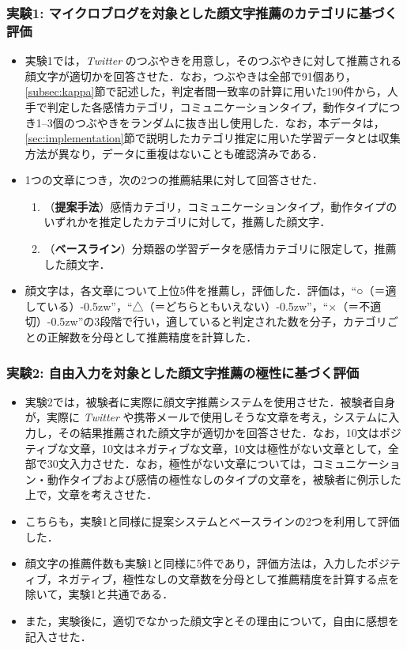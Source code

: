 \documentclass[japanese]{jnlp_1.4}
\begin{document}
\subsubsection*{実験1: マイクロブログを対象とした顔文字推薦のカテゴリに基づく評価}

\begin{itemize}
\item 実験1では，{\it Twitter} のつぶやきを用意し，そのつぶやきに対して推薦される顔文字が適切かを回答させた．なお，つぶやきは全部で91個あり，\ref{subsec:kappa}節で記述した，判定者間一致率の計算に用いた190件から，人手で判定した各感情カテゴリ，コミュニケーションタイプ，動作タイプにつき1--3個のつぶやきをランダムに抜き出し使用した．なお，本データは，\ref{sec:implementation}節で説明したカテゴリ推定に用いた学習データとは収集方法が異なり，データに重複はないことも確認済みである．
\item 1つの文章につき，次の2つの推薦結果に対して回答させた．
\begin{enumerate}
\item（{\bf 提案手法}）感情カテゴリ，コミュニケーションタイプ，動作タイプのいずれかを推定したカテゴリに対して，推薦した顔文字．
\item（{\bf ベースライン}）分類器の学習データを感情カテゴリに限定して，推薦した顔文字．
\end{enumerate}
\item 顔文字は，各文章について上位5件を推薦し，評価した．評価は，``○（＝適してい\mbox{る）{\kern-0.5zw}''，}\mbox{``△}（＝どちらともいえない）{\kern-0.5zw}''，``×（＝不適切）{\kern-0.5zw}''の3段階で行い，適していると判定された数を分子，カテゴリごとの正解数を分母として推薦精度を計算した．
\end{itemize}


\subsubsection*{実験2: 自由入力を対象とした顔文字推薦の極性に基づく評価}

\begin{itemize}
\item 実験2では，被験者に実際に顔文字推薦システムを使用させた．被験者自身が，実際に {\it Twitter} や携帯メールで使用しそうな文章を考え，システムに入力し，その結果推薦された顔文字が適切かを回答させた．なお，10文はポジティブな文章，10文はネガティブな文章，10文は極性がない文章として，全部で30文入力させた．なお，極性がない文章については，コミュニケーション・動作タイプおよび感情の極性なしのタイプの文章を，被験者に例示した上で，文章を考えさせた．
\item こちらも，実験1と同様に提案システムとベースラインの2つを利用して評価した．
\item 顔文字の推薦件数も実験1と同様に5件であり，評価方法は，入力したポジティブ，ネガティブ，極性なしの文章数を分母として推薦精度を計算する点を除いて，実験1と共通である．
\item また，実験後に，適切でなかった顔文字とその理由について，自由に感想を記入させた．
\end{itemize}
\end{document}
